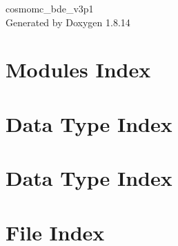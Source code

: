 \documentclass[twoside]{book}
\newcommand{\+}{\discretionary{\mbox{\scriptsize$\hookleftarrow$}}{}{}}
\newcommand{\clearemptydoublepage}{%
  \newpage{\pagestyle{empty}\cleardoublepage}%
}
\begin{document}
\hypersetup{pageanchor=false,
             bookmarksnumbered=true,
             pdfencoding=unicode
            }
\begin{titlepage}
\vspace*{7cm}
\begin{center}%
{\Large cosmomc\+\_\+bde\+\_\+v3p1 }\\
\vspace*{1cm}
{\large Generated by Doxygen 1.8.14}\\
\end{center}
\end{titlepage}
\clearemptydoublepage
{}
\tableofcontents
\clearemptydoublepage
{}
\hypersetup{pageanchor=true}

\chapter{Modules Index}

\chapter{Data Type Index}

\chapter{Data Type Index}

\chapter{File Index}

\end{document}
